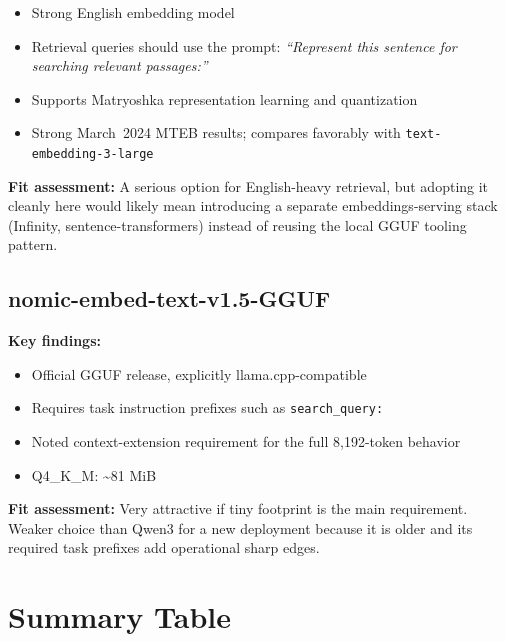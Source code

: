 \begin{itemize}
    \item Strong English embedding model
    \item Retrieval queries should use the prompt:
          \textit{``Represent this sentence for searching relevant passages:''}
    \item Supports Matryoshka representation learning and quantization
    \item Strong March~2024 MTEB results; compares favorably with \texttt{text-embedding-3-large}
\end{itemize}

\textbf{Fit assessment:} A serious option for English-heavy retrieval, but adopting it
cleanly here would likely mean introducing a separate embeddings-serving stack (Infinity,
sentence-transformers) instead of reusing the local GGUF tooling pattern.

\subsection{nomic-embed-text-v1.5-GGUF}

\textbf{Key findings:}

\begin{itemize}
    \item Official GGUF release, explicitly llama.cpp-compatible
    \item Requires task instruction prefixes such as \texttt{search\_query:}
    \item Noted context-extension requirement for the full 8{,}192-token behavior
    \item Q4\_K\_M: \textasciitilde81 MiB
\end{itemize}

\textbf{Fit assessment:} Very attractive if tiny footprint is the main requirement. Weaker
choice than Qwen3 for a new deployment because it is older and its required task prefixes
add operational sharp edges.

\section{Summary Table}

